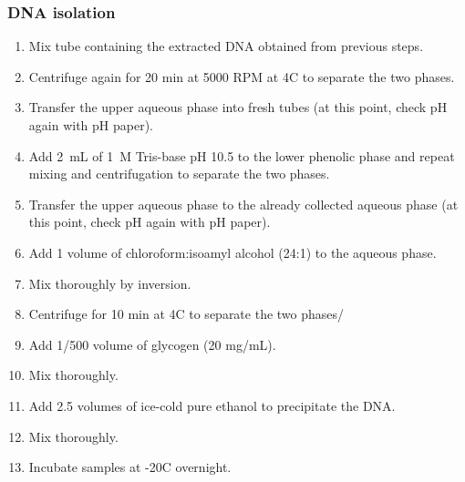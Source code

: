 \subsubsection{DNA isolation}
\begin{enumerate}
\item Mix tube containing the extracted DNA obtained from previous steps.
\item Centrifuge again for 20 min at 5000 RPM at 4\degree C to separate the two phases.
\item Transfer the upper aqueous phase into fresh tubes (at this point, check pH again with pH paper).
\item Add 2~mL of 1~M Tris-base pH 10.5 to the lower phenolic phase and repeat mixing and centrifugation to separate the two phases.
\item Transfer the upper aqueous phase to the already collected aqueous phase (at this point, check pH again with pH paper).
\item Add 1 volume of chloroform:isoamyl alcohol (24:1) to the aqueous phase.
\item Mix thoroughly by inversion.
\item Centrifuge for 10 min at 4\degree C to separate the two phases/
\item Add 1/500 volume of glycogen (20 mg/mL).
\item Mix thoroughly.
\item Add 2.5 volumes of ice-cold pure ethanol to precipitate the DNA. 
\item Mix thoroughly.
\item Incubate samples at -20\degree C overnight.
\end{enumerate}




